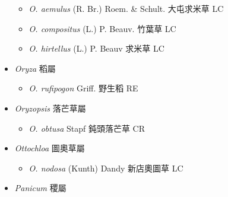 \begin{itemize}
  \begin{itemize}
        \item[] \textit{O. aemulus} (R. Br.) Roem. \& Schult.  大屯求米草   LC
        \item[] \textit{O. compositus} (L.) P. Beauv.  竹葉草   LC
        \item[] \textit{O. hirtellus} (L.) P. Beauv  求米草   LC
  \end{itemize}
 \item[] \textit{Oryza} 稻屬
                                
  \begin{itemize}
        \item[] \textit{O. rufipogon} Griff.  野生稻   RE
  \end{itemize}
 \item[] \textit{Oryzopsis} 落芒草屬
                                
  \begin{itemize}
        \item[] \textit{O. obtusa} Stapf  鈍頭落芒草   CR
  \end{itemize}
 \item[] \textit{Ottochloa} 圖奧草屬
                                
  \begin{itemize}
        \item[] \textit{O. nodosa} (Kunth) Dandy  新店奧圖草   LC
  \end{itemize}
 \item[] \textit{Panicum} 稷屬
                                

\end{itemize}
